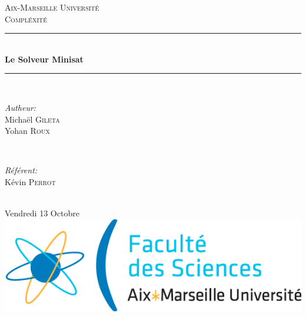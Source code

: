 \documentclass[12pt]{report}
\begin{document}
\begin{titlepage}
\vspace*{\fill}
\newcommand{\HRule}{\rule{\linewidth}{0.5mm}}

\center

\textsc{\LARGE Aix-Marseille Université}\\[1.5cm]
\textsc{\Large Compléxité}\\[0.5cm]

\HRule \\[0.4cm]
{ \huge \bfseries Le Solveur Minisat}\\[0.4cm] %
\HRule \\[1.5cm]

\begin{minipage}{0.4\textwidth}
\begin{flushleft} \large
\emph{Autheur:}\\
Michaël \textsc{Gileta} \\
Yohan \textsc{Roux}
\end{flushleft}
\end{minipage}
~
\begin{minipage}{0.4\textwidth}
\begin{flushright} \large
\emph{Référent:} \\
Kévin \textsc{Perrot}
\end{flushright}
\end{minipage}\\[2cm]

{\large Vendredi 13 Octobre}\\[2cm]

\includegraphics[scale=0.5]{./images/logo.png}\\[1cm]

\vspace*{\fill}
\end{titlepage}

\end{document}
